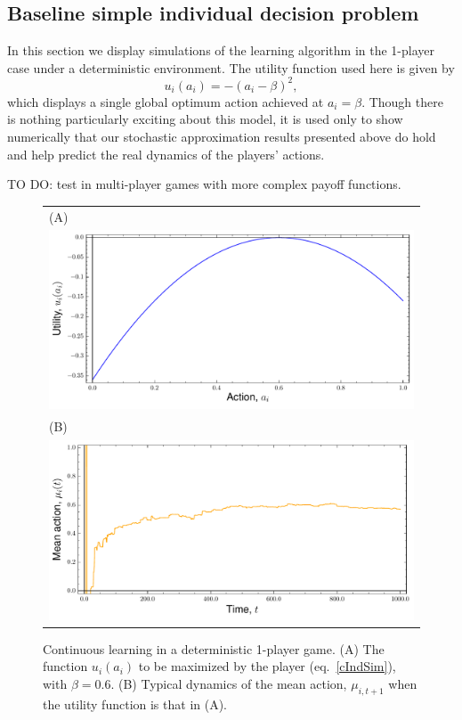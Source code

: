 \documentclass[11pt,reqno]{amsart}
\newcommand{\ac}{a}
\newcommand{\tm}{t}%
\newcommand{\pf}{u}
\newcommand{\ma}{\mu}
\newcommand{\ba}{\beta}
\begin{document}
\subsection{Baseline simple individual decision problem}

In this section we display simulations of the learning algorithm in the 1-player case under a deterministic environment. The utility function used here is given by
\begin{equation}
\label{cIndSim}
\pf_i(\ac_i) = - (\ac_i - \ba)^2,
\end{equation}
which displays a single global optimum action achieved at $\ac_i = \ba$. Though there is nothing particularly exciting about this model, it is used only to show numerically that our stochastic approximation results presented above do hold and help predict the real dynamics of the players' actions.

TO DO: test in multi-player games with more complex payoff functions.




\begin{figure}[h]
\begin{center}
\begin{tabular}{l}
  (A) \\
\includegraphics[scale=0.5]{simUf.pdf}\\
  (B) \\
 \includegraphics[scale=0.5]{meanDyn.pdf}\\
\end{tabular}
\caption{Continuous learning in a deterministic 1-player game. (A) The function $\pf_i(\ac_i)$ to be maximized by the player (eq.~\ref{cIndSim}), with $\ba=0.6$. (B) Typical dynamics of the mean action, $\ma_{i,\tm+1}$ when the utility function is that in (A).}
\label{simIndDyn}
\end{center}
\end{figure}
\end{document}

